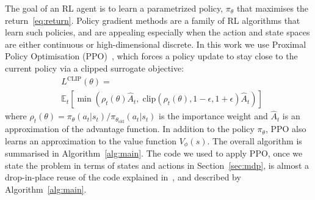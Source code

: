 \noindent The goal of an RL agent is to learn a parametrized policy, \(\pi_{\theta}\) that maximises the return~\ref{eq:return}.
Policy gradient methods are a family of RL algorithms that learn such policies, and are appealing especially 
when the action and state spaces are either continuous or high-dimensional discrete.
In this work we use Proximal Policy Optimisation (PPO)~\cite{schulman2017proximal}, which forces a policy 
update to stay close to the current policy via a clipped surrogate objective:
\begin{equation}
\begin{split}
    &L^{\text{CLIP}}(\theta) = \\
    &\mathbb{E}_t\!\left[\min\!\left(\rho_t(\theta)\hat{A}_t,\; \text{clip}(\rho_t(\theta), 1-\epsilon, 1+\epsilon)\hat{A}_t\right)\right]
\end{split}
\end{equation}
where \(\rho_t(\theta) = \pi_\theta(a_t|s_t)/\pi_{\theta_{\text{old}}}(a_t|s_t)\) is the importance weight and \(\hat{A}_t\) is an approximation of the advantage function.
In addition to the policy \(\pi_\theta\), PPO also learns an approximation to the value 
function \(V_\phi(s)\). The overall algorithm is summarised in Algorithm~\ref{alg:main}. 
The code we used to apply PPO, once we state the problem in terms of states and actions in Section~\ref{sec:mdp}, 
is almost a drop-in-place reuse of the code explained in~\cite{bou2024torchrl}, and described by Algorithm~\ref{alg:main}.


